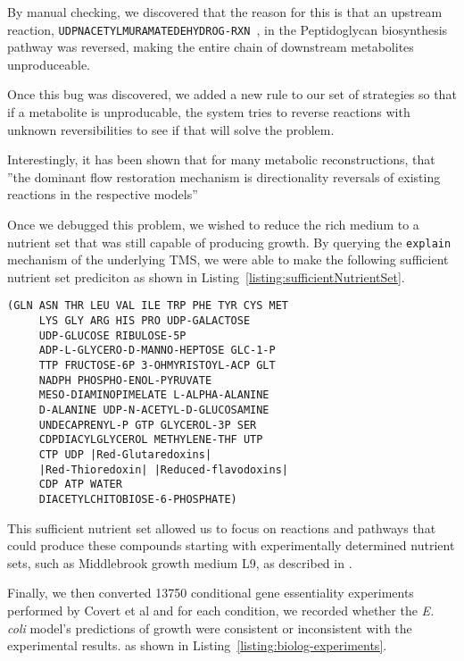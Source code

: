 By manual checking, we discovered that the reason for this is that an upstream reaction, {\tt UDPNACETYLMURAMATEDEHYDROG-RXN }, in the Peptidoglycan biosynthesis pathway was reversed, making the entire chain of downstream metabolites unproduceable. 

Once this bug was discovered,  we added a new rule to our set of strategies so that
 if a metabolite is unproducable, the system tries to reverse
reactions with unknown reversibilities to see if that will
solve the problem.  

Interestingly, it has been shown that for many metabolic reconstructions,
that ''the dominant flow restoration mechanism is directionality
reversals of existing reactions in the respective
models''\cite{kumar2007}

Once we debugged this problem, we wished to reduce the rich medium to a nutrient set that was still
capable of producing growth. By querying the {\tt explain} mechanism of the underlying TMS, we were able to make the following
sufficient nutrient set prediciton as shown in Listing~\ref{listing:sufficientNutrientSet}.
\begin{lstlisting}[label={listing:sufficientNutrientSet},caption={{\em E. coli} predicted sufficient nutrient set}]
(GLN ASN THR LEU VAL ILE TRP PHE TYR CYS MET 
     LYS GLY ARG HIS PRO UDP-GALACTOSE 
     UDP-GLUCOSE RIBULOSE-5P 
     ADP-L-GLYCERO-D-MANNO-HEPTOSE GLC-1-P 
     TTP FRUCTOSE-6P 3-OHMYRISTOYL-ACP GLT 
     NADPH PHOSPHO-ENOL-PYRUVATE 
     MESO-DIAMINOPIMELATE L-ALPHA-ALANINE 
     D-ALANINE UDP-N-ACETYL-D-GLUCOSAMINE 
     UNDECAPRENYL-P GTP GLYCEROL-3P SER
     CDPDIACYLGLYCEROL METHYLENE-THF UTP 
     CTP UDP |Red-Glutaredoxins|
     |Red-Thioredoxin| |Reduced-flavodoxins| 
     CDP ATP WATER
     DIACETYLCHITOBIOSE-6-PHOSPHATE)
\end{lstlisting}
This sufficient nutrient set allowed us to focus on reactions and pathways that could produce these compounds starting
with experimentally determined nutrient sets, such as Middlebrook growth medium L9, as described in \cite{joyce2006}.


Finally, we then converted 13750 conditional gene essentiality experiments performed by
Covert et al\cite{covert2004} and for each condition, we recorded
whether the {\em E. coli} model's predictions of growth were
consistent or inconsistent with the experimental results. as shown in Listing~\ref{listing:biolog-experiments}.

